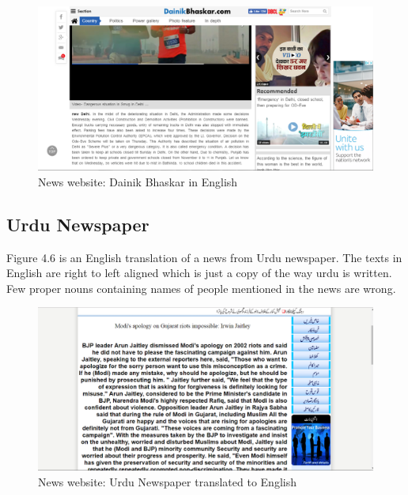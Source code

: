 \documentclass[12pt]{report}
\begin{document}
\begin{figure}[ht]
  \centering
  \includegraphics[width=1\textwidth]{Problem6_9/DainikBhaskar_English.PNG}
  \caption{News website: Dainik Bhaskar in English}
  \label{fig:7}
\end{figure} 
\subsection{Urdu Newspaper}
Figure 4.6 is an English translation of a news from Urdu newspaper. The texts in English are right to left aligned which is just a copy of the way urdu is written. Few proper nouns containing names of people mentioned in the news are wrong.
\begin{figure}[ht]
  \centering
  \includegraphics[width=1\textwidth]{Problem6_9/Urdu_newspaper_English.PNG}
  \caption{News website: Urdu Newspaper translated to English}
  \label{fig:7}
\end{figure} 
\end{document}
